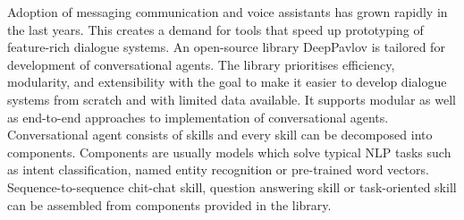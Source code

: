 Adoption of messaging communication and voice assistants has grown rapidly in the last years. This creates a demand for tools that speed up prototyping of feature-rich dialogue systems. An open-source library DeepPavlov is tailored for development of conversational agents. The library prioritises efficiency, modularity, and extensibility with the goal to make it easier to develop dialogue systems from scratch and with limited data available. It supports modular as well as end-to-end approaches to implementation of conversational agents. Conversational agent consists of skills and every skill can be decomposed into components. Components are usually models which solve typical NLP tasks such as intent classification, named entity recognition or pre-trained word vectors. Sequence-to-sequence chit-chat skill, question answering skill or task-oriented skill can be assembled from components provided in the library.
